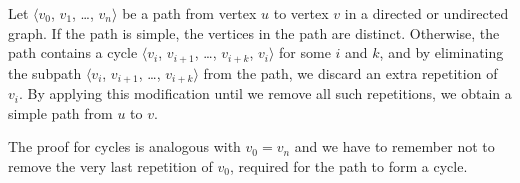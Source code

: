 Let $\langle v_0$, $v_1$, \dots, $v_n\rangle$ be a path from vertex $u$ to vertex $v$ in a directed or undirected graph.
If the path is simple, the vertices in the path are distinct.
Otherwise, the path contains a cycle $\langle v_i$, $v_{i+1}$, \dots, $v_{i+k}$, $v_i\rangle$ for some $i$ and $k$, and by eliminating the subpath $\langle v_i$, $v_{i+1}$, \dots, $v_{i+k}\rangle$ from the path, we discard an extra repetition of $v_i$.
By applying this modification until we remove all such repetitions, we obtain a simple path from $u$ to $v$.

The proof for cycles is analogous with $v_0=v_n$ and we have to remember not to remove the very last repetition of $v_0$, required for the path to form a cycle.
